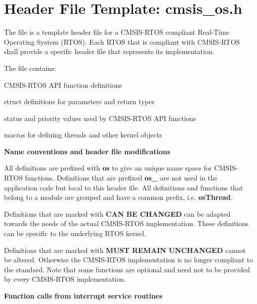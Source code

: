 \chapter{Header File Template\+: cmsis\+\_\+os.\+h}
\hypertarget{cmsis_os_h}{}\label{cmsis_os_h}
The file {\bfseries{}} is a template header file for a CMSIS-\/\+RTOS compliant Real-\/\+Time Operating System (RTOS). Each RTOS that is compliant with CMSIS-\/\+RTOS shall provide a specific {\bfseries{}} header file that represents its implementation.

The file  contains\+:
\begin{DoxyItemize}
\item CMSIS-\/\+RTOS API function definitions
\item struct definitions for parameters and return types
\item status and priority values used by CMSIS-\/\+RTOS API functions
\item macros for defining threads and other kernel objects
\end{DoxyItemize}

{\bfseries{Name conventions and header file modifications}}

All definitions are prefixed with {\bfseries{os}} to give an unique name space for CMSIS-\/\+RTOS functions. Definitions that are prefixed {\bfseries{os\+\_\+}} are not used in the application code but local to this header file. All definitions and functions that belong to a module are grouped and have a common prefix, i.\+e. {\bfseries{os\+Thread}}.

Definitions that are marked with {\bfseries{CAN BE CHANGED}} can be adapted towards the needs of the actual CMSIS-\/\+RTOS implementation. These definitions can be specific to the underlying RTOS kernel.

Definitions that are marked with {\bfseries{MUST REMAIN UNCHANGED}} cannot be altered. Otherwise the CMSIS-\/\+RTOS implementation is no longer compliant to the standard. Note that some functions are optional and need not to be provided by every CMSIS-\/\+RTOS implementation.

{\bfseries{Function calls from interrupt service routines}}

